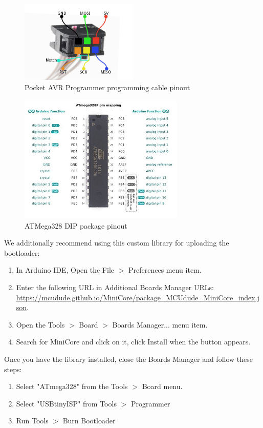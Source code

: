 \documentclass{article}
\begin{document}
\begin{figure}[h]
    \center
    \includegraphics[width=0.5\textwidth,keepaspectratio]{avr_pinout}
    \caption{Pocket AVR Programmer programming cable pinout}
    \label{img:avr_pinout_fig}
\end{figure}

\begin{figure}[h]
    \center
    \includegraphics[width=0.7\textwidth,keepaspectratio]{atmega_pinout}
    \caption{ATMega328 DIP package pinout}
    \label{img:atmega_pinout_fig}
\end{figure}

We additionally recommend using this custom library for uploading the bootloader:
\begin{enumerate}
    \item In Arduino IDE, Open the File $>$ Preferences menu item.
    \item Enter the following URL in Additional Boards Manager URLs: \url{https://mcudude.github.io/MiniCore/package_MCUdude_MiniCore_index.json}.
    \item Open the Tools $>$ Board $>$ Boards Manager... menu item.
    \item Search for MiniCore and click on it, click Install when the button appears.
\end{enumerate}
Once you have the library installed, close the Boards Manager and follow these steps:
\begin{enumerate}
    \item Select "ATmega328" from the Tools $>$ Board menu.
    \item Select "USBtinyISP" from Tools $>$ Programmer
    \item Run Tools $>$ Burn Bootloader
\end{enumerate}
\end{document}
